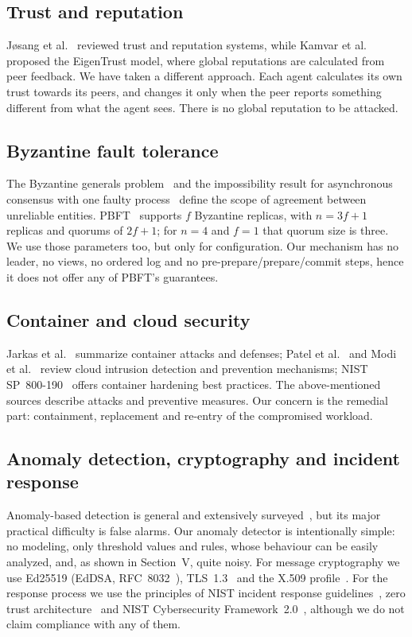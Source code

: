 \documentclass[journal]{IEEEtran}
\begin{document}
\subsection{Trust and reputation}
J{\o}sang et al.~\cite{josang07} reviewed trust and reputation systems, while Kamvar et al.~\cite{kamvar03} proposed the EigenTrust model, where global reputations are calculated from peer feedback. We have taken a different approach. Each agent calculates its own trust towards its peers, and changes it only when the peer reports something different from what the agent sees. There is no global reputation to be attacked.

\subsection{Byzantine fault tolerance}
The Byzantine generals problem~\cite{lamport82} and the impossibility result for asynchronous consensus with one faulty process~\cite{flp85} define the scope of agreement between unreliable entities. PBFT~\cite{castro99,castro02} supports $f$ Byzantine replicas, with $n=3f+1$ replicas and quorums of $2f+1$; for $n=4$ and $f=1$ that quorum size is three. We use those parameters too, but only for configuration. Our mechanism has no leader, no views, no ordered log and no pre-prepare/prepare/commit steps, hence it does not offer any of PBFT's guarantees.

\subsection{Container and cloud security}
Jarkas et al.~\cite{jarkas25} summarize container attacks and defenses; Patel et al.~\cite{patel13} and Modi et al.~\cite{modi13} review cloud intrusion detection and prevention mechanisms; NIST SP~800-190~\cite{nist190} offers container hardening best practices. The above-mentioned sources describe attacks and preventive measures. Our concern is the remedial part: containment, replacement and re-entry of the compromised workload.

\subsection{Anomaly detection, cryptography and incident response}
Anomaly-based detection is general and extensively surveyed~\cite{garcia09,bhuyan14,khraisat19}, but its major practical difficulty is false alarms. Our anomaly detector is intentionally simple: no modeling, only threshold values and rules, whose behaviour can be easily analyzed, and, as shown in Section~V, quite noisy. For message cryptography we use Ed25519 (EdDSA, RFC~8032~\cite{rfc8032}), TLS~1.3~\cite{rfc8446} and the X.509 profile~\cite{rfc5280}. For the response process we use the principles of NIST incident response guidelines~\cite{nist61}, zero trust architecture~\cite{nist207} and NIST Cybersecurity Framework~2.0~\cite{csf2}, although we do not claim compliance with any of them.
\end{document}
